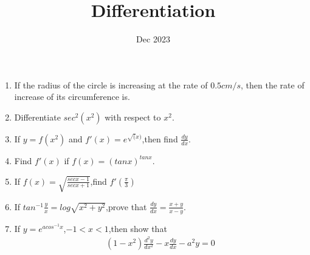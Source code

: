 \documentclass[12pt,-letter paper]{article}
\title{Differentiation}
\date{Dec 2023}
\begin{document}
\maketitle
\begin{enumerate}
\item If the radius of the circle is increasing at the rate of $0.5cm/s$, then the rate of increase of its circumference is.

\item Differentiate $sec^2(x^2)$ with respect to $x^2$.

\item If $y=f(x^2)$ and $f'(x)=e^{\sqrt(x)}$,then find $\frac{dy}{dx}$.

\item Find $f'(x)$ if $f(x)=(tan x)^{tan x}$.

\item If $f(x)=\sqrt{\frac{sec x -1}{sec x + 1}}$,find $f'(\frac{\pi}{3})$

\item If $tan^{-1}\frac{y}{x}= log\sqrt{x^2 + y^2}$,prove that $\frac{dy}{dx}=\frac{x+y}{x-y}$.

\item If $y=e^{a cos^{-1}x}$,$-1<x<1$,then show that
	\begin{align}
	(1-x^2)\frac{d^2y}{dx^2}-x\frac{dy}{dx}-a^2y=0
	\end{align}
\end{enumerate}
\end{document}
